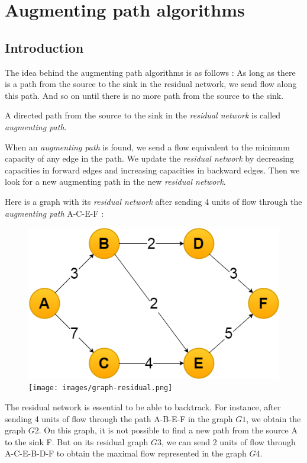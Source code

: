\section{Augmenting path algorithms}
\subsection{Introduction}
The idea behind the augmenting path algorithms is as follows : 
As long as there is a path from the source to the sink in the residual network, we send flow along this path. And so on until there is no more path from the source to the sink.\newline

A directed path from the source to the sink in the \textit{residual network} is called \textit{augmenting path}. \newline

When an \textit{augmenting path} is found, we send a flow equivalent to the minimum capacity of any edge in the path. We update the \textit{residual network} by decreasing capacities in forward edges and increasing capacities in backward edges. Then we look for a new augmenting path in the new \textit{residual network}. \newline

Here is a graph with its \textit{residual network} after sending 4 units of flow through the \textit{augmenting path} A-C-E-F : \newline

\begin{figure}[!h]
\includegraphics[scale=0.4]{images/graph.png}\hfill
\texttt{[image: images/graph-residual.png]}
\end{figure}
\newpage
The residual network is essential to be able to backtrack. For instance, after sending 4 units of flow through the path A-B-E-F in the graph $G1$, we obtain the graph $G2$. On this graph, it is not possible to find a new path from the source A to the sink F. But on its residual graph $G3$, we can send 2 units of flow through A-C-E-B-D-F to obtain the maximal flow represented in the graph $G4$.


